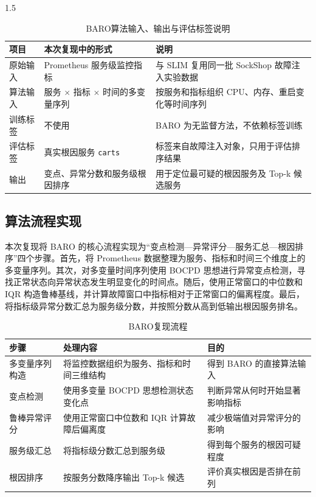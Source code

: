 \documentclass[a4paper,12pt]{report}
\begin{document}
\begin{spacing}{1.5}
\begin{table}[H]
\centering
\caption{BARO算法输入、输出与评估标签说明}
\begin{tabular}{p{3cm}p{4.2cm}p{6.2cm}}
\toprule
\textbf{项目} & \textbf{本次复现中的形式} & \textbf{说明} \\
\midrule
原始输入 & Prometheus 服务级监控指标 & 与 SLIM 复用同一批 SockShop 故障注入实验数据 \\
算法输入 & 服务 $\times$ 指标 $\times$ 时间的多变量序列 & 按服务和指标组织 CPU、内存、重启变化等时间序列 \\
训练标签 & 不使用 & BARO 为无监督方法，不依赖标签训练 \\
评估标签 & 真实根因服务 \texttt{carts} & 标签来自故障注入对象，只用于评估排序结果 \\
输出 & 变点、异常分数和服务级根因排序 & 用于定位最可疑的根因服务及 Top-k 候选服务 \\
\bottomrule
\end{tabular}
\end{table}

\subsection{算法流程实现}

本次复现将 BARO 的核心流程实现为“变点检测—异常评分—服务汇总—根因排序”四个步骤。首先，将 Prometheus 数据整理为服务、指标和时间三个维度上的多变量序列。其次，对多变量时间序列使用 BOCPD 思想进行异常变点检测，寻找正常状态向异常状态发生明显变化的时间点。随后，使用正常窗口的中位数和 IQR 构造鲁棒基线，并计算故障窗口中指标相对于正常窗口的偏离程度。最后，将指标级异常分数汇总为服务级分数，并按照分数从高到低输出根因服务排名。

\begin{table}[H]
\centering
\caption{BARO复现流程}
\begin{tabular}{p{3cm}p{5.2cm}p{5cm}}
\toprule
\textbf{步骤} & \textbf{处理内容} & \textbf{目的} \\
\midrule
多变量序列构造 & 将监控数据组织为服务、指标和时间三维结构 & 得到 BARO 的直接算法输入 \\
变点检测 & 使用多变量 BOCPD 思想检测状态变化点 & 判断异常从何时开始显著影响指标 \\
鲁棒异常评分 & 使用正常窗口中位数和 IQR 计算故障后偏离度 & 减少极端值对异常评分的影响 \\
服务级汇总 & 将指标级分数汇总到服务级 & 得到每个服务的根因可疑程度 \\
根因排序 & 按服务分数降序输出 Top-k 候选 & 评价真实根因是否排在前列 \\
\bottomrule
\end{tabular}
\end{table}


\end{spacing}
\end{document}
